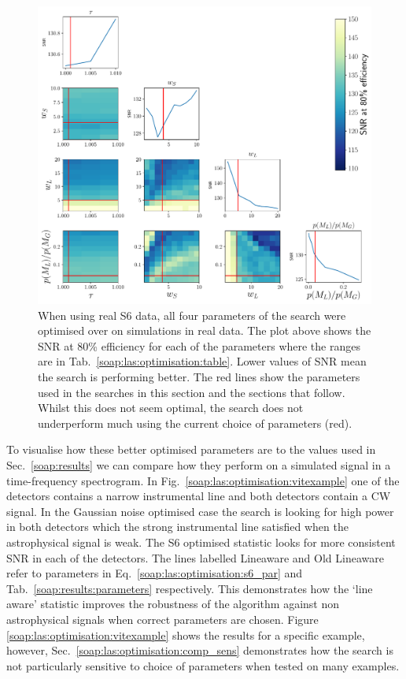 \begin{figure}[p]
    \centering
    \includegraphics[width=\linewidth]{C3_soap/s6_optimised.pdf}
    \caption[Optimisation of line aware statistic in real S6 data.]{When using real S6 data, all four parameters of the search were optimised over on simulations in real data. The plot above shows the \gls{SNR} at 80\% efficiency for each of the parameters where the ranges are in Tab.~\ref{soap:las:optimisation:table}. Lower values of \gls{SNR} mean the search is performing better. The red lines show the parameters used in the searches in this section and the sections that follow. Whilst this does not seem optimal, the search does not underperform much using the current choice of parameters (red). }
    \label{soap:las:optimisation:s6mdc}
\end{figure}

To visualise how these better optimised parameters are to the values used in
Sec.~\ref{soap:results} we can compare how they perform on a simulated signal
in a time-frequency spectrogram. In Fig.~\ref{soap:las:optimisation:vitexample} one of the detectors contains a narrow instrumental line and both detectors contain a \gls{CW} signal.
In the Gaussian noise optimised case the search is looking for high power in both
detectors which the strong instrumental line satisfied when the astrophysical
signal is weak.  The S6 optimised statistic looks for more consistent \gls{SNR}
in each of the detectors.  The lines labelled Lineaware and Old Lineaware refer to parameters in Eq.~\ref{soap:las:optimisation:s6_par} and Tab.~\ref{soap:results:parameters} respectively. 
This demonstrates how the `line aware' statistic improves the robustness of the
algorithm against non astrophysical signals when correct parameters are chosen.
Figure \ref{soap:las:optimisation:vitexample} shows the results for a specific example, however, Sec.~\ref{soap:las:optimisation:comp_sens} demonstrates how the search is not particularly sensitive to choice of parameters when tested on many examples. 

